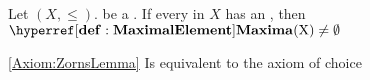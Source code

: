 \label{Axiom:ZornsLemma}
\begin{thm}
Let $(X,\leq)$. be a 
\Poset. If every 
\Chain in $X$ has an 
\UpperBound, then $\Maxima(X) \neq \emptyset$ 
\end{thm}
\begin{rmk}\ref{Axiom:ZornsLemma} Is equivalent to the axiom of choice
\end{rmk}
